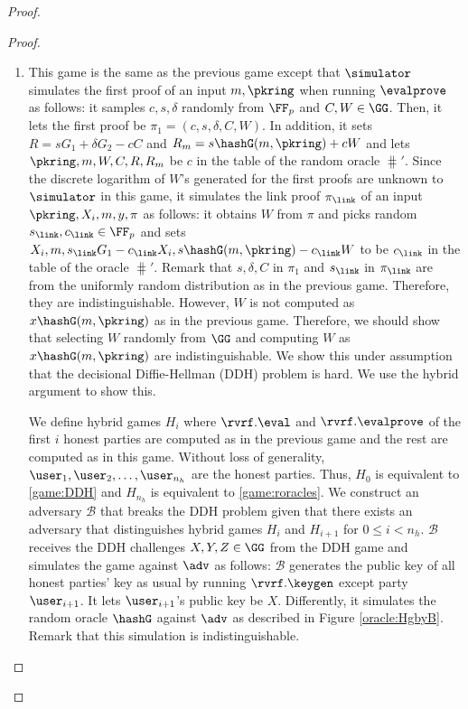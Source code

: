 \begin{proof}
\begin{proof}
\begin{enumerate}[label={{Game} }{{\arabic*}}, start = 0]
			
			\item \label{game:DDH}This game is the same as the previous game except that $ \simulator $ simulates the first proof of an input $ m, \pkring $ when running $ \evalprove $ as follows: it samples $ c,s,\delta $ randomly from $ \FF_p $ and $ C, W \in \GG $. Then, it lets the first proof be $\pi_1 =  (c, s, \delta, C, W) $. 
			In addition, it sets $ R = sG_1+ \delta G_2- cC $ and $ R_m = s \hashG(m, \pkring)+ cW $ and lets $ \pkring,m, W,C, R, R_m$ be $ c $ in the table of the random oracle $ \hash' $. Since the discrete logarithm of $ W $'s generated for the first proofs are unknown to $ \simulator $ in this game, it simulates the link proof $ \pi_\link $ of an input $ \pkring, X_i, m, y, \pi $ as follows: it obtains $ W $ from $ \pi $ and picks random $ s_\link,c_\link \in \FF_p$ and sets $ X_i, m, s_\link G_1 - c_\link X_i, s\hashG(m,\pkring) - c_\link W$ to be $ c_\link $ in the table of the oracle $ \hash' $. Remark that $ s,\delta,C $ in $ \pi_1 $ and $ s_\link $ in $ \pi_\link $ are from the uniformly random distribution as in the previous game. Therefore, they are indistinguishable. However, $ W $ is not computed as $x \hashG(m, \pkring) $ as in the previous game. Therefore, we should show that selecting $ W $ randomly from $ \GG $ and computing $ W $ as $x \hashG(m, \pkring) $ are indistinguishable.
			We  show this under assumption that the decisional Diffie-Hellman (DDH) problem  is hard. We use the hybrid argument to show this.
			
			We define hybrid games $ H_{i} $ where $ \rvrf.\eval $ and $ \rvrf.\evalprove $ of the first $ i $ honest parties are computed as in the previous game and the rest are computed as in this game. Without loss of generality, $ \user_1, \user_2, \ldots, \user_{n_h} $ are the honest parties. Thus, $ H_0 $ is equivalent to \ref{game:DDH} and $ H_{n_h}  $ is equivalent to \ref{game:roracles}.  We construct an adversary $ \mathcal{B} $ that breaks the DDH problem given that there exists an adversary that distinguishes hybrid games $ H_i $ and $ H_{i + 1} $ for $ 0 \leq i < n_h $. $ \mathcal{B} $ receives the DDH challenges $ X,Y, Z \in \GG $ from the DDH game and simulates the game against $ \adv $ as follows: $ \mathcal{B} $ generates the public key of all  honest parties' key as usual by running $ \rvrf.\keygen$ except party $ \user_{i+1} $. It lets $ \user_{i+1} $'s public key be $ X $. Differently, it simulates the random oracle $ \hashG $ against $ \adv $ as described in Figure \ref{oracle:HgbyB}. Remark that this simulation is indistinguishable.
			

\end{enumerate}
\end{proof}
\end{proof}
